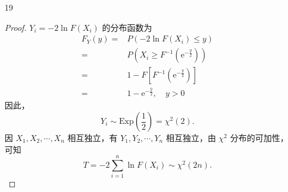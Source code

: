 \documentclass[normal,founder,mtpro2,cn]{elegantnote}
\begin{document}
\begin{enumerate}
\begin{proof}
            当 $r=2$ 时，由于 $k>0$，只要 $m>4$，就有
            \begin{equation*}
                E\left(F^{2}\right)=\frac{m^{2}\Gamma\left(\frac{k}{2}+2\right)\Gamma\left(\frac{m}{2}-2\right)}{k^{2}\Gamma\left(\frac{k}{2}\right)\Gamma\left(\frac{m}{2}\right)}=\frac{m^{2}(k+2)}{k(m-2)(m-4)}
            \end{equation*}

            因此，
            \begin{equation*}
                \operatorname{Var}(F)=E\left(F^{2}\right)-[E(F)]^{2}=\frac{m^{2}(k+2)}{k(m-2)(m-4)}-\left(\frac{m}{m-2}\right)^{2}=\frac{2m^{2}(m+k-2)}{k(m-2)^{2}(m-4)}
            \end{equation*}
        \end{proof}
    \item[19]
        \begin{proof}
            $Y_{i}=-2\ln F\left(X_{i}\right)$ 的分布函数为
            \begin{equation*}
                \begin{aligned}
                    F_{Y}(y)= & P\left(-2\ln F\left(X_{i}\right)\leq y\right)                        \\
                    =         & P\left(X_{i}\geq F^{-1}\left(\mathrm{e}^{-\frac{y}{2}}\right)\right) \\
                    =         & 1-F\left[F^{-1}\left(\mathrm{e}^{-\frac{y}{2}}\right)\right]         \\
                    =         & 1-\mathrm{e}^{-\frac{y}{2}},\quad y>0
                \end{aligned}
            \end{equation*}
            因此，
            \begin{equation*}
                Y_{i}\sim\text{Exp}\left(\frac{1}{2}\right)=\chi^{2}(2).
            \end{equation*}
            因 $X_{1},X_{2},\cdots,X_{n}$ 相互独立，有 $Y_{1},Y_{2},\cdots,Y_{n}$ 相互独立，由 $\chi^{2}$ 分布的可加性，可知
            \begin{equation*}
                T=-2\sum_{i=1}^{n}\ln F\left(X_{i}\right)\sim\chi^{2}(2n).
            \end{equation*}
        \end{proof}
\end{enumerate}
\end{document}
